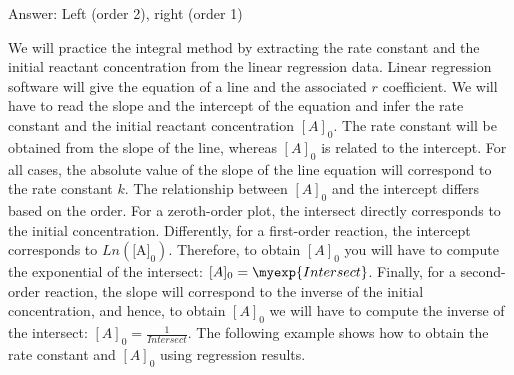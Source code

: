 \documentclass[main.tex]{subfiles}
\begin{document}
\begin{description}
\begin{example}
\begin{center}
\begin{tikzpicture}
\end{tikzpicture}\hspace{0.5cm}\vspace{-0.6cm}
\end{center}\flushright Answer:   Left (order 2), right (order 1)
\end{example}%

\item[\docfilehook{The integral method: extracting data from linear regressions}{}] 
We will practice the integral method by extracting the rate constant and the initial reactant concentration from the linear regression data. Linear regression software will give the equation of a line and the associated $r$ coefficient. We will have to read the slope and the intercept of the equation and infer the rate constant and the initial reactant concentration $[A]_0$.
The rate constant will be obtained from the slope of the line, whereas $[A]_0$ is related to the intercept.
For all cases, the absolute value of the slope of the line equation will correspond to the rate constant $k$. The relationship between $[A]_0$ and the intercept differs based on the order. For a zeroth-order plot, the intersect directly corresponds to the initial concentration. Differently, for a first-order reaction, the intercept corresponds to $Ln(\text{[A]}_0)$. Therefore, to obtain $[A]_0$ you will have to compute the exponential of the intersect: $[A]_0=\myexp{Intersect}$. Finally, for a second-order reaction, the slope will correspond to the inverse of the initial concentration, and hence, to obtain $[A]_0$ we will have to compute the inverse of the intersect: $[A]_0=\frac{1}{Intersect}$. The following example shows how to obtain the rate constant and $[A]_0$ using regression results.


\end{description}
\end{document}
